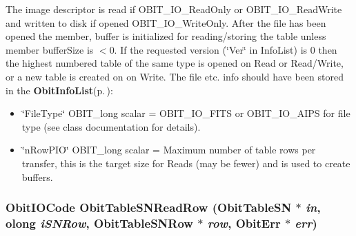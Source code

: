 The image descriptor is read if OBIT\_\-IO\_\-Read\-Only or OBIT\_\-IO\_\-Read\-Write and written to disk if opened OBIT\_\-IO\_\-Write\-Only. After the file has been opened the member, buffer is initialized for reading/storing the table unless member buffer\-Size is $<$0. If the requested version (\char`\"{}Ver\char`\"{} in Info\-List) is 0 then the highest numbered table of the same type is opened on Read or Read/Write, or a new table is created on on Write. The file etc. info should have been stored in the {\bf Obit\-Info\-List}{\rm (p.\,\pageref{structObitInfoList})}: \begin{itemize}
\item \char`\"{}File\-Type\char`\"{} OBIT\_\-long scalar = OBIT\_\-IO\_\-FITS or OBIT\_\-IO\_\-AIPS for file type (see class documentation for details). \item \char`\"{}n\-Row\-PIO\char`\"{} OBIT\_\-long scalar = Maximum number of table rows per transfer, this is the target size for Reads (may be fewer) and is used to create buffers. 
\end{itemize}
\subsubsection{\setlength{\rightskip}{0pt plus 5cm}Obit\-IOCode Obit\-Table\-SNRead\-Row ({\bf Obit\-Table\-SN} $\ast$ {\em in}, {\bf olong} {\em i\-SNRow}, {\bf Obit\-Table\-SNRow} $\ast$ {\em row}, {\bf Obit\-Err} $\ast$ {\em err})}\label{ObitTableSN_8c_a22}


